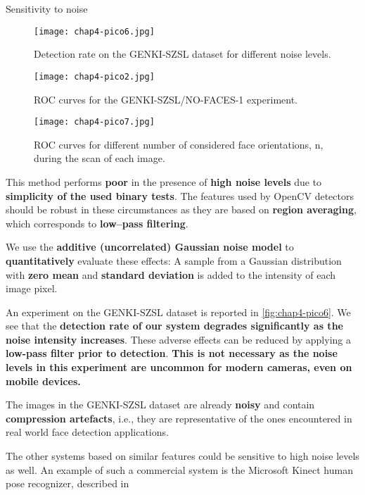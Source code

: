 \begin{compactitem}
\item{Sensitivity to noise}
\begin{figure}[ht]
  \centering
  \texttt{[image: chap4-pico6.jpg]}
  \caption{Detection rate on the GENKI-SZSL dataset for different noise levels.}
 \label{fig:chap4-pico6}
\end{figure}

\begin{figure}[h!]
  \centering
  \texttt{[image: chap4-pico2.jpg]}
  \caption{ROC curves for the GENKI-SZSL/NO-FACES-1 experiment.}
 \label{fig:chap4-pico2}
\end{figure}


\begin{figure}[h!]
  \centering
  \texttt{[image: chap4-pico7.jpg]}
  \caption{ROC curves for different number of considered face orientations, n, during the scan of each image.}
 \label{fig:chap4-pico7}
\end{figure}

This method performs \textbf{poor} in the presence of \textbf{high noise levels} due to
\textbf{simplicity of the used binary tests}. The features used by OpenCV detectors
should be robust in these circumstances as they are based on \textbf{region averaging},
which corresponds to \textbf{low--pass filtering}.

We use the \textbf{additive (uncorrelated) Gaussian noise model}
to \textbf{quantitatively} evaluate these effects:
A sample from a Gaussian distribution with \textbf{zero mean}
and \textbf{standard deviation} is added to the intensity of each image pixel.

An experiment on the GENKI-SZSL dataset is reported in \autoref{fig:chap4-pico6}.
We see that the \textbf{detection rate of our system degrades significantly as the noise intensity increases}.
These adverse effects can be reduced by applying a \textbf{low-pass filter prior to detection}.
\textbf{This is not necessary as the noise levels in this experiment are uncommon for modern cameras,
even on mobile devices.}

The images in the GENKI-SZSL dataset are already \textbf{noisy} and contain
\textbf{compression artefacts}, i.e., they are representative of the ones encountered in real world
face detection applications.

The other systems based on similar features could be sensitive to high noise levels as well.
An example of such a commercial system is the Microsoft Kinect human pose recognizer, described in


\end{compactitem}
